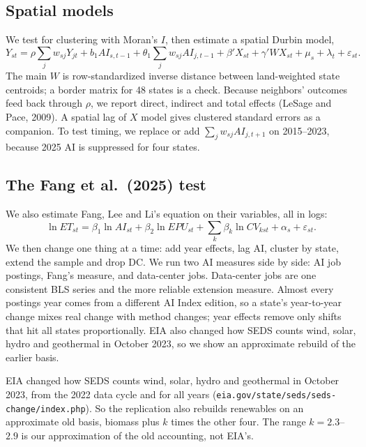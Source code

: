 \subsection{Spatial models}
We test for clustering with Moran's $I$, then estimate a spatial Durbin model,
\begin{equation}
Y_{st} = \rho \sum_j w_{sj} Y_{jt} + b_1 AI_{s,t-1} + \theta_1 \sum_j w_{sj} AI_{j,t-1} + \beta' X_{st} + \gamma' W X_{st} + \mu_s + \lambda_t + \varepsilon_{st}.
\end{equation}
The main $W$ is row-standardized inverse distance between land-weighted state centroids; a border matrix for 48 states is a check. Because neighbors' outcomes feed back through $\rho$, we report direct, indirect and total effects (LeSage and Pace, 2009). A spatial lag of $X$ model gives clustered standard errors as a companion. To test timing, we replace or add $\sum_j w_{sj} AI_{j,t+1}$ on 2015--2023, because 2025 AI is suppressed for four states.

\subsection{The Fang et al.\ (2025) test}
We also estimate Fang, Lee and Li's equation on their variables, all in logs:
\begin{equation}
\ln ET_{st} = \beta_1 \ln AI_{st} + \beta_2 \ln EPU_{st} + \sum_k \beta_k \ln CV_{kst} + \alpha_s + \varepsilon_{st}.
\end{equation}
We then change one thing at a time: add year effects, lag AI, cluster by state, extend the sample and drop DC. We run two AI measures side by side: AI job postings, Fang's measure, and data-center jobs. Data-center jobs are one consistent BLS series and the more reliable extension measure. Almost every postings year comes from a different AI Index edition, so a state's year-to-year change mixes real change with method changes; year effects remove only shifts that hit all states proportionally. EIA also changed how SEDS counts wind, solar, hydro and geothermal in October 2023, so we show an approximate rebuild of the earlier basis.

EIA changed how SEDS counts wind, solar, hydro and geothermal in October 2023, from the 2022 data cycle and for all years (\texttt{eia.gov/state/seds/seds-change/index.php}). So the replication also rebuilds renewables on an approximate old basis, biomass plus $k$ times the other four. The range $k = 2.3$--$2.9$ is our approximation of the old accounting, not EIA's.

